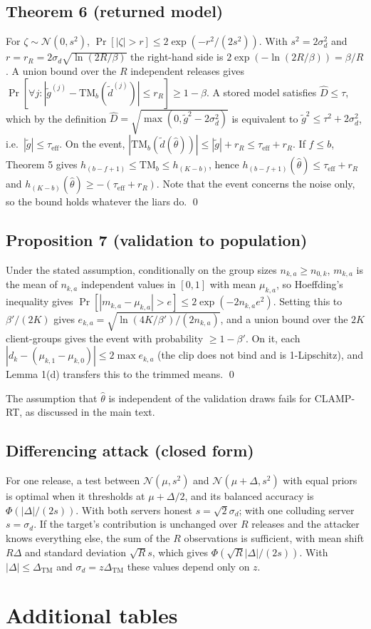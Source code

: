 \documentclass[11pt]{article}
\theoremstyle{plain}
\theoremstyle{definition}
\newcommand{\Dhat}{\widehat{D}}
\newcommand{\TM}{\mathrm{TM}_b}
\newcommand{\DTM}{\Delta_{\mathrm{TM}}}
\newcommand{\gt}{\tilde g}
\newcommand{\rt}{CLAMP-RT}
\begin{document}
\subsection*{Theorem 6 (returned model)}
For $\zeta\sim\mathcal{N}(0,s^2)$, $\Pr[|\zeta|>r]\le2\exp(-r^2/(2s^2))$. With $s^2=2\sigma_d^2$ and $r=r_R=2\sigma_d\sqrt{\ln(2R/\beta)}$ the right-hand side is $2\exp(-\ln(2R/\beta))=\beta/R$. A union bound over the $R$ independent releases gives $\Pr[\forall j:|\gt^{(j)}-\TM(\tilde d^{(j)})|\le r_R]\ge1-\beta$. A stored model satisfies $\Dhat\le\tau$, which by the definition $\Dhat=\sqrt{\max(0,\gt^2-2\sigma_d^2)}$ is equivalent to $\gt^2\le\tau^2+2\sigma_d^2$, i.e.\ $|\gt|\le\tau_{\mathrm{eff}}$. On the event, $|\TM(\tilde d(\hat\theta))|\le|\gt|+r_R\le\tau_{\mathrm{eff}}+r_R$. If $f\le b$, Theorem 5 gives $h_{(b-f+1)}\le\TM\le h_{(K-b)}$, hence $h_{(b-f+1)}(\hat\theta)\le\tau_{\mathrm{eff}}+r_R$ and $h_{(K-b)}(\hat\theta)\ge-(\tau_{\mathrm{eff}}+r_R)$. Note that the event concerns the noise only, so the bound holds whatever the liars do. \qed

\subsection*{Proposition 7 (validation to population)}
Under the stated assumption, conditionally on the group sizes $n_{k,a}\ge n_{0,k}$, $m_{k,a}$ is the mean of $n_{k,a}$ independent values in $[0,1]$ with mean $\mu_{k,a}$, so Hoeffding's inequality gives $\Pr[|m_{k,a}-\mu_{k,a}|>e]\le2\exp(-2n_{k,a}e^2)$. Setting this to $\beta'/(2K)$ gives $e_{k,a}=\sqrt{\ln(4K/\beta')/(2n_{k,a})}$, and a union bound over the $2K$ client-groups gives the event with probability $\ge1-\beta'$. On it, each $|d_k-(\mu_{k,1}-\mu_{k,0})|\le2\max e_{k,a}$ (the clip does not bind and is 1-Lipschitz), and Lemma 1(d) transfers this to the trimmed means. \qed

The assumption that $\hat\theta$ is independent of the validation draws fails for \rt{}, as discussed in the main text.

\subsection*{Differencing attack (closed form)}
For one release, a test between $\mathcal{N}(\mu,s^2)$ and $\mathcal{N}(\mu+\Delta,s^2)$ with equal priors is optimal when it thresholds at $\mu+\Delta/2$, and its balanced accuracy is $\Phi(|\Delta|/(2s))$. With both servers honest $s=\sqrt2\sigma_d$; with one colluding server $s=\sigma_d$. If the target's contribution is unchanged over $R$ releases and the attacker knows everything else, the sum of the $R$ observations is sufficient, with mean shift $R\Delta$ and standard deviation $\sqrt R s$, which gives $\Phi(\sqrt R|\Delta|/(2s))$. With $|\Delta|\le\DTM$ and $\sigma_d=z\DTM$ these values depend only on $z$.

\clearpage
\section{Additional tables}









\end{document}
